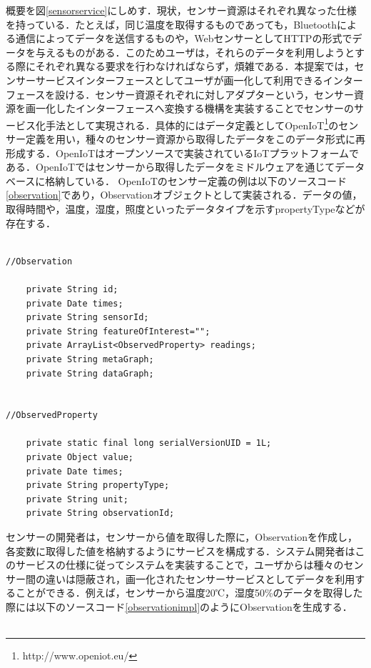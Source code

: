 \documentclass{kuisthesis}			%
\begin{document}
概要を図\ref{sensorservice}にしめす．現状，センサー資源はそれぞれ異なった仕様を持っている．たとえば，同じ温度を取得するものであっても，Bluetoothによる通信によってデータを送信するものや，WebセンサーとしてHTTPの形式でデータを与えるものがある．このためユーザは，それらのデータを利用しようとする際にそれぞれ異なる要求を行わなければならず，煩雑である．本提案では，センサーサービスインターフェースとしてユーザが画一化して利用できるインターフェースを設ける．センサー資源それぞれに対しアダプターという，センサー資源を画一化したインターフェースへ変換する機構を実装することでセンサーのサービス化手法として実現される．具体的にはデータ定義としてOpenIoT\footnote{http://www.openiot.eu/}のセンサー定義を用い，種々のセンサー資源から取得したデータをこのデータ形式に再形成する．OpenIoTはオープンソースで実装されているIoTプラットフォームである．OpenIoTではセンサーから取得したデータをミドルウェアを通じてデータベースに格納している．
OpenIoTのセンサー定義の例は以下のソースコード\ref{observation}であり，Observationオブジェクトとして実装される．データの値，取得時間や，温度，湿度，照度といったデータタイプを示すpropertyTypeなどが存在する．\\
\\
\begin{lstlisting}[caption=センサー定義例,label=observation]
//Observation

	private String id;	
	private Date times;	
	private String sensorId;
	private String featureOfInterest=""; 
	private ArrayList<ObservedProperty> readings;
	private String metaGraph;
	private String dataGraph;
	
	
//ObservedProperty

	private static final long serialVersionUID = 1L;
	private Object value;
	private Date times;
	private String propertyType;
	private String unit;
	private String observationId;
\end{lstlisting}

センサーの開発者は，センサーから値を取得した際に，Observationを作成し，各変数に取得した値を格納するようにサービスを構成する．システム開発者はこのサービスの仕様に従ってシステムを実装することで，ユーザからは種々のセンサー間の違いは隠蔽され，画一化されたセンサーサービスとしてデータを利用することができる．例えば，センサーから温度20℃，湿度50\%のデータを取得した際には以下のソースコード\ref{observationimpl}のようにObservationを生成する．\\
\\
\end{document}
